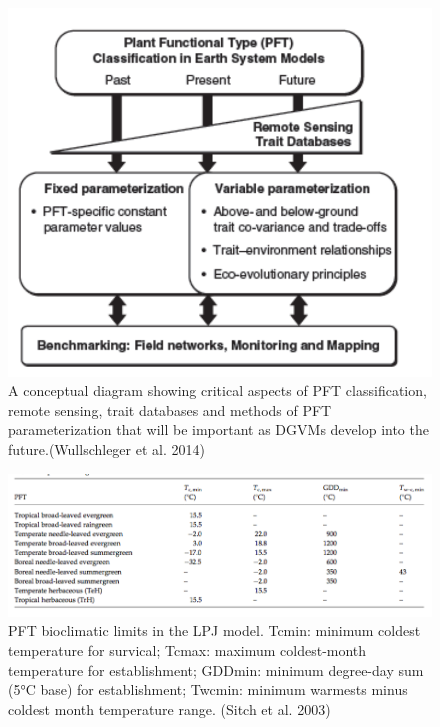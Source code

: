 \documentclass[12pt,oneside]{book}
\begin{document}
\begin{figure}

{\centering \includegraphics[width=0.8\linewidth]{figures/chap7/f712_pft_wullschleger} 

}

\caption{A conceptual diagram showing critical aspects of PFT classification, remote sensing, trait databases and methods of PFT parameterization that will be important as DGVMs develop into the future.(Wullschleger et al. 2014)}\label{fig:f712}
\end{figure}

\begin{figure}

{\centering \includegraphics[width=0.8\linewidth]{figures/chap7/f713_lpj_bioclim_table} 

}

\caption{PFT bioclimatic limits in the LPJ model. Tcmin: minimum coldest temperature for survical; Tcmax: maximum coldest-month temperature for establishment; GDDmin: minimum degree-day sum (5°C base) for establishment; Twcmin: minimum warmests minus coldest month temperature range. (Sitch et al. 2003)}\label{fig:f713}
\end{figure}
\end{document}
